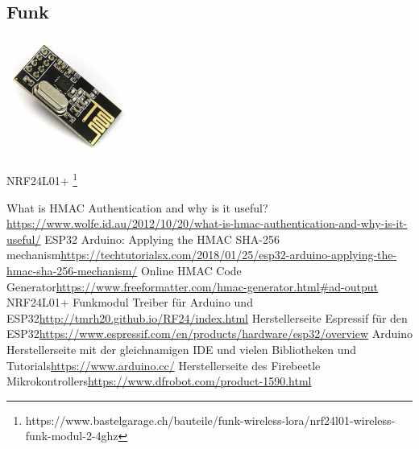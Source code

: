\documentclass[
  12pt, %
  a4paper, %
  twoside, %
  openany, %
  numbers=noenddot, %
  BCOR=5mm, %
  parskip=half*, %
  thesis, %
]{bfhbook}
\newcommand{\compImgSize}{4cm}
\begin{document}
\subsection{Funk}
\begin{flushleft}
        \includegraphics[width=\compImgSize]{Bilder/NRF24.jpg} %
        \captionsetup{justification=raggedright}
\end{flushleft}
NRF24L01+ \footnote{https://www.bastelgarage.ch/bauteile/funk-wireless-lora/nrf24l01-wireless-funk-modul-2-4ghz}
\listoffigures
\listoftables
\printglossary

\renewcommand\bibname{Linkverzeichnis}
\begin{thebibliography}{99}
    What is HMAC Authentication and why is it useful?\break \url{https://www.wolfe.id.au/2012/10/20/what-is-hmac-authentication-and-why-is-it-useful/}
     ESP32 Arduino: Applying the HMAC SHA-256 mechanism\break \url{https://techtutorialsx.com/2018/01/25/esp32-arduino-applying-the-hmac-sha-256-mechanism/}
     Online HMAC Code Generator\break \url{https://www.freeformatter.com/hmac-generator.html#ad-output}
     NRF24L01+ Funkmodul Treiber für Arduino und ESP32\break \url{http://tmrh20.github.io/RF24/index.html}
     Herstellerseite Espressif für den ESP32\break \url{https://www.espressif.com/en/products/hardware/esp32/overview}
     Arduino Herstellerseite mit der gleichnamigen IDE und vielen Bibliotheken und Tutorials\break \url{https://www.arduino.cc/}
     Herstellerseite des Firebeetle Mikrokontrollers\break \url{https://www.dfrobot.com/product-1590.html}
  \end{thebibliography}
\end{document}
